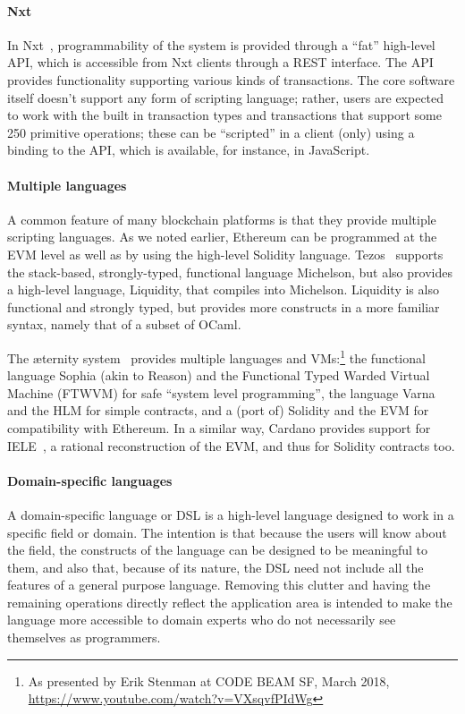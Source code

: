\documentclass[
      acmsmall
    , screen
  ]{acmart}
\begin{document}
\paragraph{Nxt}

In Nxt~\cite{Nxt}, programmability of the system is provided through a ``fat'' high-level 
API, which is accessible from Nxt clients through a REST interface. The API provides functionality supporting various 
kinds of transactions. The core software itself doesn't support any form of scripting language; rather, users are 
expected to work with the built in transaction types and transactions that support some 250 primitive operations; these 
can be ``scripted'' in a client (only) using a binding to the API, which is available, for instance, in JavaScript.

\paragraph{Multiple languages}

A common feature of many blockchain platforms is that they provide multiple scripting languages. As we noted earlier, Ethereum can be programmed at the EVM level as well as by using the high-level Solidity language. Tezos~\cite{tezos-white-paper} supports the stack-based, strongly-typed, functional language Michelson, but also provides a high-level language, Liquidity, that compiles into Michelson. Liquidity is also functional and strongly typed, but provides more constructs in a more familiar syntax, namely that of a subset of OCaml. 

The \ae{}ternity system~\cite{aeternity} provides multiple languages and VMs:\footnote{As presented by Erik Stenman at CODE BEAM SF, March 2018, \url{https://www.youtube.com/watch?v=VXsqvfPIdWg}} the functional language  Sophia (akin to Reason) and the Functional Typed Warded Virtual Machine (FTWVM) for safe ``system level programming'', the language Varna and the HLM for simple contracts, and a (port of) Solidity and the EVM for compatibility with Ethereum. In a similar way, Cardano provides support for IELE~\cite{IELE}, a rational reconstruction of the EVM, and thus for Solidity contracts too. 

\paragraph{Domain-specific languages} 

A domain-specific language or DSL is a high-level language designed to work in a specific field or domain. The intention 
is that because the users will know about the field, the constructs of the language can be designed to be meaningful to 
them, and also that, because of its nature, the DSL need not include all the features of a general purpose language. 
Removing this clutter and having the remaining operations directly reflect the application area is intended to make the 
language more accessible to domain experts who do not necessarily see themselves as programmers.
\end{document}
